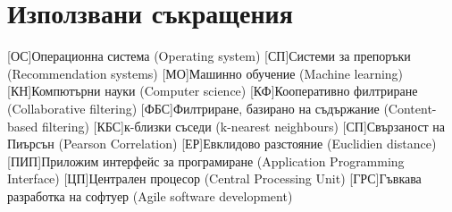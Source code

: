 \chapter{Използвани съкращения}
	\begin{acronym}
		[ОС]{Операционна система (Operating system)}
		[СП]{Системи за препоръки (Recommendation systems)}
		[МО]{Машинно обучение (Machine learning)}
		[КН]{Компютърни науки (Computer science)}
		[КФ]{Кооперативно филтриране (Collaborative filtering)}
		[ФБС]{Филтриране, базирано на съдържание (Content-based filtering)}
		[КБС]{к-близки съседи (k-nearest neighbours)}
		[СП]{Свързаност на Пиърсън (Pearson Correlation)}
		[ЕР]{Евклидово разстояние (Euclidien distance)}
		[ПИП]{Приложим интерфейс за програмиране (Application Programming Interface)}
		[ЦП]{Централен процесор (Central Processing Unit)}
		[ГРС]{Гъвкава разработка на софтуер (Agile software development)}
	\end{acronym}